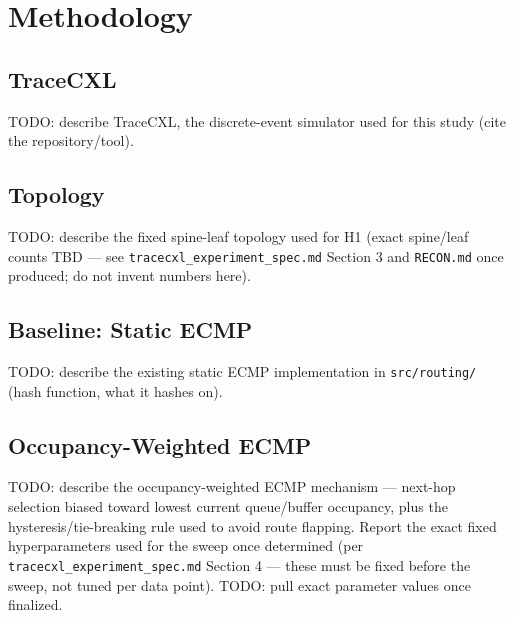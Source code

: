 %

\section{Methodology}
\label{sec:methodology}

\subsection{TraceCXL}
TODO: describe TraceCXL, the discrete-event simulator used for this study
(cite the repository/tool).

\subsection{Topology}
TODO: describe the fixed spine-leaf topology used for H1 (exact spine/leaf
counts TBD — see \texttt{tracecxl\_experiment\_spec.md} Section 3 and
\texttt{RECON.md} once produced; do not invent numbers here).

\subsection{Baseline: Static ECMP}
TODO: describe the existing static ECMP implementation in
\texttt{src/routing/} (hash function, what it hashes on).

\subsection{Occupancy-Weighted ECMP}
TODO: describe the occupancy-weighted ECMP mechanism — next-hop selection
biased toward lowest current queue/buffer occupancy, plus the
hysteresis/tie-breaking rule used to avoid route flapping. Report the
exact fixed hyperparameters used for the sweep once determined (per
\texttt{tracecxl\_experiment\_spec.md} Section 4 — these must be fixed
before the sweep, not tuned per data point). TODO: pull exact parameter
values once finalized.
